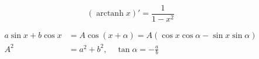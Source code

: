 \documentclass{article}
\DeclareMathOperator{\arctanh}{arctanh}
\begin{document}
\begin{multicols}{2}
\vspace*{0mm}

\begin{equation*}
  (\arctanh x)' = \frac{1}{1-x^2}
\end{equation*}

\begin{align*}
  a \sin x + b \cos x & = A \cos(x + \alpha) = A \left( \cos x \cos \alpha - \sin x \sin \alpha \right) \\
  A^2 & = a^2 + b^2 , \quad \tan \alpha = - \frac{a}{b}
\end{align*}

\pagebreak


\end{multicols}
\end{document}
